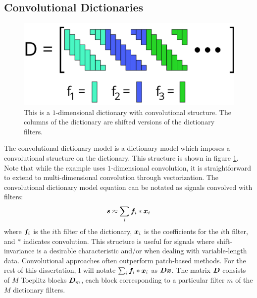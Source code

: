\subsection{Convolutional Dictionaries}
\begin{figure}
	\includegraphics[width=\textwidth]{figures/convolutionalDictionary.png}
	\caption{This is a $1$-dimensional dictionary with convolutional structure. The columns of the dictionary are shifted versions of the dictionary filters.}
	\label{Figure: Convolutional Dictionary}
\end{figure}
The convolutional dictionary model is a dictionary model which imposes a convolutional structure on the dictionary. This structure is shown in figure \ref{Figure: Convolutional Dictionary}. Note that while the example uses $1$-dimensional convolution, it is straightforward to extend to multi-dimensional convolution through vectorization. The convolutional dictionary model equation can be notated as signals convolved with filters:
%
\begin{equation}
\bm{s} \approx \sum_i \bm{f}_i * \bm{x}_i
\end{equation}
%
where $\bm{f}_i$ is the $i$th filter of the dictionary, $\bm{x}_i$ is the coefficients for the $i$th filter, and $*$ indicates convolution. This structure is useful for signals where shift-invariance is a desirable characteristic and/or when dealing with variable-length data. Convolutional approaches often outperform patch-based methods. For the rest of this dissertation, I will notate $\sum_i \bm{f}_i * \bm{x}_i$ as $\bm{D}\bm{x}$. The matrix $\bm{D}$ consists of $M$ Toeplitz blocks $\bm{D}_{m}$, each block corresponding to a particular filter $m$ of the $M$ dictionary filters.

